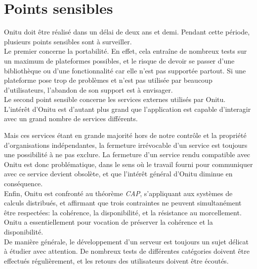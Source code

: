 \section{Points sensibles}
Onitu doit être réalisé dans un délai de deux ans et demi. Pendant cette période, plusieurs points sensibles sont à surveiller.\\

Le premier concerne la portabilité. En effet, cela entraîne de nombreux tests sur un maximum de plateformes possibles, et le risque de devoir se passer d'une bibliothèque ou d'une fonctionnalité car elle n'est pas supportée partout. Si une plateforme pose trop de problèmes et n'est pas utilisée par beaucoup d'utilisateurs, l'abandon de son support est à envisager.\\

Le second point sensible concerne les services externes utilisés par Onitu. L'intérêt d'Onitu est d'autant plus grand que l'application est capable d'interagir avec un grand nombre de services différents.

Mais ces services étant en grande majorité hors de notre contrôle et la propriété d'organisations indépendantes, la fermeture irrévocable d'un service est toujours une possibilité à ne pas exclure. La fermeture d'un service rendu compatible avec Onitu est donc problématique, dans le sens où le travail fourni pour communiquer avec ce service devient obsolète, et que l'intérêt général d'Onitu diminue en conséquence.\\

Enfin, Onitu est confronté au théorème \textit{CAP}, s'appliquant aux systèmes de calculs distribués, et affirmant que trois contraintes ne peuvent simultanément être respectées: la cohérence, la disponibilité, et la résistance au morcellement. Onitu a essentiellement pour vocation de préserver la cohérence et la disponibilité.\\

De manière générale, le développement d'un serveur est toujours un sujet délicat à étudier avec attention. De nombreux tests de différentes catégories doivent être effectués régulièrement, et les retours des utilisateurs doivent être écoutés.